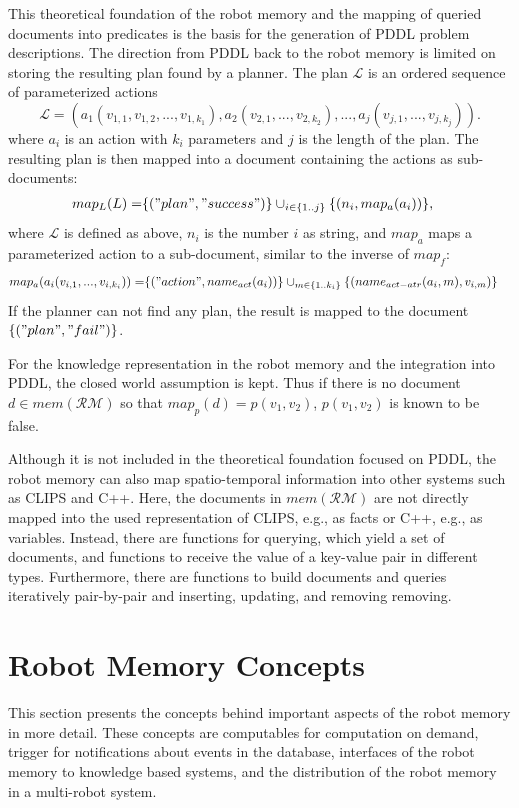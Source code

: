 This theoretical foundation of the robot memory and the mapping of
queried documents into predicates is the basis for the generation of
PDDL problem descriptions. The direction from PDDL back to the robot
memory is limited on storing the resulting plan found by a
planner. The plan $\mathcal{L}$ is an ordered sequence of
parameterized actions
$$\mathcal{L}=(a_1(v_{1,1},v_{1,2},...,v_{1,k_1}),a_2(v_{2,1},...,v_{2,k_2}),...,a_j(v_{j,1},...,v_{j,k_j})) \text{.}$$
where $a_i$ is an action with $k_i$ parameters and $j$ is the length
of the plan. The resulting plan is then mapped into a document
containing the actions as sub-documents:
\begin{align*}
  map_L(L)=&\{("plan", "success")\} \cup_{i \in \{1..j\}}\{(n_i, map_a(a_i))\} \text{,}
\end{align*}
where $\mathcal{L}$ is defined as above, $n_i$ is the number $i$ as
string, and $map_a$ maps a parameterized action to a sub-document,
similar to the inverse of $map_f$:
\begin{align*}
  map_a(a_i(v_{i,1},...,v_{i,k_i}))= &\{("action", name_{act}(a_i))\} 
\cup_{m \in \{1..k_i\}}\{(name_{act-atr}(a_i,m), v_{i,m})\}
\end{align*}
If the planner can not find any plan, the result is mapped to the
document $\{("plan", "fail")\}$.

For the knowledge representation in the robot memory and the
integration into PDDL, the closed world assumption is kept. Thus if
there is no document $d\in mem(\mathcal{RM})$ so that
$map_p(d)=p(v_1,v_2)$, $p(v_1,v_2)$ is known to be false.

Although it is not included in the theoretical foundation focused on
PDDL, the robot memory can also map spatio-temporal information into
other systems such as CLIPS and C++. Here, the documents in
$mem(\mathcal{RM})$ are not directly mapped into the used
representation of CLIPS, e.g., as facts or C++, e.g., as
variables. Instead, there are functions for querying, which yield a
set of documents, and functions to receive the value of a key-value
pair in different types. Furthermore, there are functions to build
documents and queries iteratively pair-by-pair and inserting,
updating, and removing removing.

\section{Robot Memory Concepts}
\label{sec:concepts}
This section presents the concepts behind important aspects of the
robot memory in more detail. These concepts are computables for
computation on demand, trigger for notifications about events in the
database, interfaces of the robot memory to knowledge based systems,
and the distribution of the robot memory in a multi-robot system.

